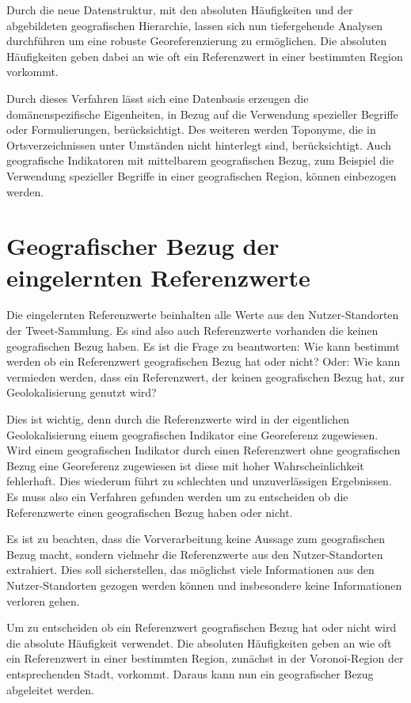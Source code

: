 			Durch die neue Datenstruktur, mit den absoluten Häufigkeiten und der abgebildeten geografischen Hierarchie, lassen sich nun tiefergehende Analysen durchführen um eine robuste Georeferenzierung zu ermöglichen. 
			Die absoluten Häufigkeiten geben dabei an wie oft ein Referenzwert in einer bestimmten Region vorkommt.

			Durch dieses Verfahren lässt sich eine Datenbasis erzeugen die domänenspezifische Eigenheiten, in Bezug auf die Verwendung spezieller Begriffe oder Formulierungen, berücksichtigt.
			Des weiteren werden Toponyme, die in Ortsverzeichnissen unter Umständen nicht hinterlegt sind, berücksichtigt.
			Auch geografische Indikatoren mit mittelbarem geografischen Bezug, zum Beispiel die Verwendung spezieller Begriffe in einer geografischen Region, können einbezogen werden. 

	\section{Geografischer Bezug der eingelernten Referenzwerte}
			
		Die eingelernten Referenzwerte beinhalten alle Werte aus den Nutzer-Standorten der Tweet-Sammlung.
		Es sind also auch Referenzwerte vorhanden die keinen geografischen Bezug haben.
		Es ist die Frage zu beantworten: Wie kann bestimmt werden ob ein Referenzwert geografischen Bezug hat oder nicht?
		Oder: Wie kann vermieden werden, dass ein Referenzwert, der keinen geografischen Bezug hat, zur Geolokalisierung genutzt wird?
		
		Dies ist wichtig, denn durch die Referenzwerte wird in der eigentlichen Geolokalisierung einem geografischen Indikator eine Georeferenz zugewiesen. 
		Wird einem geografischen Indikator durch einen Referenzwert ohne geografischen Bezug eine Georeferenz zugewiesen ist diese mit hoher Wahrscheinlichkeit fehlerhaft.
		Dies wiederum führt zu schlechten und unzuverlässigen Ergebnissen.
		Es muss also ein Verfahren gefunden werden um zu entscheiden ob die Referenzwerte einen geografischen Bezug haben oder nicht.

		Es ist zu beachten, dass die Vorverarbeitung keine Aussage zum geografischen Bezug macht, sondern vielmehr die Referenzwerte aus den Nutzer-Standorten extrahiert. 
		Dies soll sicherstellen, das möglichst viele Informationen aus den Nutzer-Standorten gezogen werden können und insbesondere keine Informationen verloren gehen.  
		
		Um zu entscheiden ob ein Referenzwert geografischen Bezug hat oder nicht wird die absolute Häufigkeit verwendet.
		Die absoluten Häufigkeiten geben an wie oft ein Referenzwert in einer bestimmten Region, zunächst in der Voronoi-Region der entsprechenden Stadt, vorkommt.			 
		Daraus kann nun ein geografischer Bezug abgeleitet werden.


